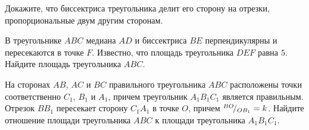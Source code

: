 \begin{tasks}
    \item Докажите, что биссектриса треугольника делит его сторону на отрезки, пропорциональные двум другим сторонам.
    \item В треугольнике $ABC$ медиана $AD$ и биссектриса $BE$ перпендикулярны и пересекаются в точке $F$. Известно, что площадь треугольника $DEF$ равна $5$. Найдите площадь треугольника $ABC$.
    \item На сторонах $AB$, $AC$ и $BC$ правильного треугольника $ABC$ расположены точки соответственно $C_1$, $B_1$ и $A_1$, причем треугольник $A_1B_1C_1$ является правильным. Отрезок $BB_1$ пересекает сторону $C_1A_1$ в точке $O$, причем ${}^{BO}\!/_{OB_1} = k$. Найдите отношение площади треугольника $ABC$ к площади треугольника $A_1B_1C_1$.
\end{tasks}
